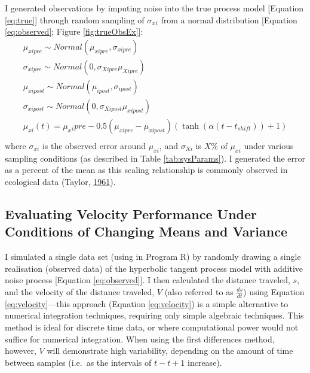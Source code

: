 \documentclass[12pt,twoside,openany]{reedthesis}
\begin{document}
I generated observations by imputing noise into the true process model {[}Equation \eqref{eq:true}{]} through random sampling of \(\sigma_x{_i}\) from a normal distribution {[}Equation \eqref{eq:observed}; Figure \ref{fig:trueObsEx}{]}:
\begin{equation}
\begin{array}{rcl}
\mu_{xipre}\sim Normal(\mu_{xipre},\sigma_{xipre}) \\ 
\sigma_{xipre} \sim Normal(0,\sigma_{Xipre}\mu_{Xipre}) \\
\mu_{xipost} \sim Normal(\mu_{ipost},\sigma_{ipost}) \\ 
\sigma_{xipost} \sim Normal(0,\sigma_{Xipost}\mu_{xipost}) \\
\mu_{xi}(t) = \mu_x{_ipre}  - 0.5(\mu_{xipre}-\mu_{xipost})(\tanh(\alpha (t-t_{shift}))+1) \\
\end{array}
\label{eq:observed}
\end{equation}
where \(\sigma_{xi}\) is the observed error around \(\mu_{xi}\), and \(\sigma_{Xi}\) is \(X\%\) of \(\mu_{xi}\) under various sampling conditions (as described in Table \ref{tab:sysParams}). I generated the error as a percent of the mean as this scaling relationship is commonly observed in ecological data (Taylor, \protect\hyperlink{ref-taylor1961aggregation}{1961}).

\hypertarget{evaluating-velocity-performance-under-conditions-of-changing-means-and-variance}{%
\subsection{Evaluating Velocity Performance Under Conditions of Changing Means and Variance}\label{evaluating-velocity-performance-under-conditions-of-changing-means-and-variance}}

I simulated a single data set (using in Program R) by randomly drawing a single realisation (observed data) of the hyperbolic tangent process model with additive noise process {[}Equation \eqref{eq:observed}{]}. I then calculated the distance traveled, \(s\), and the velocity of the distance traveled, \(V\) (also referred to as \(\frac{ds}{dt}\)) using Equation \eqref{eq:velocity}---this approach (Equation \eqref{eq:velocity}) is a simple alternative to numerical integration techniques, requiring only simple algebraic techniques. This method is ideal for discrete time data, or where computational power would not suffice for numerical integration. When using the first differences method, however, \(V\) will demonstrate high variability, depending on the amount of time between samples (i.e.~as the intervals of \(t-t+1\) increase).
\end{document}

